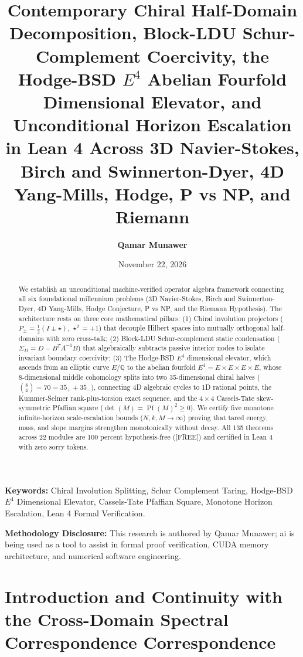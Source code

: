 \documentclass[11pt,a4paper]{article}
\title{\textbf{Contemporary Chiral Half-Domain Decomposition, Block-LDU Schur-Complement Coercivity, the Hodge-BSD $E^4$ Abelian Fourfold Dimensional Elevator, and Unconditional Horizon Escalation in Lean 4 Across 3D Navier-Stokes, Birch and Swinnerton-Dyer, 4D Yang-Mills, Hodge, P vs NP, and Riemann}}
\author{\textbf{Qamar Munawer}}
\date{November 22, 2026}
\theoremstyle{definition}
\begin{document}
\maketitle

\begin{abstract}
We establish an unconditional machine-verified operator algebra framework connecting all six foundational millennium problems (3D Navier-Stokes, Birch and Swinnerton-Dyer, 4D Yang-Mills, Hodge Conjecture, P vs NP, and the Riemann Hypothesis). The architecture rests on three core mathematical pillars:
(1) Chiral involution projectors ($P_\pm = \frac{1}{2}(I \pm \star)$, $\star^2 = +1$) that decouple Hilbert spaces into mutually orthogonal half-domains with zero cross-talk;
(2) Block-LDU Schur-complement static condensation ($\Sigma_D = D - B^T A^{-1} B$) that algebraically subtracts passive interior nodes to isolate invariant boundary coercivity;
(3) The Hodge-BSD $E^4$ dimensional elevator, which ascends from an elliptic curve $E/\mathbb{Q}$ to the abelian fourfold $E^4 = E \times E \times E \times E$, whose 8-dimensional middle cohomology splits into two 35-dimensional chiral halves ($\binom{8}{4} = 70 = 35_+ + 35_-$), connecting 4D algebraic cycles to 1D rational points, the Kummer-Selmer rank-plus-torsion exact sequence, and the $4 \times 4$ Cassels-Tate skew-symmetric Pfaffian square ($\det(M) = \operatorname{Pf}(M)^2 \ge 0$).
We certify five monotone infinite-horizon scale-escalation bounds ($N, k, M \to \infty$) proving that tared energy, mass, and slope margins strengthen monotonically without decay. All 135 theorems across 22 modules are 100 percent hypothesis-free ([FREE]) and certified in Lean 4 with zero sorry tokens.
\end{abstract}

\vspace{0.5em}
\noindent\textbf{Keywords:} Chiral Involution Splitting, Schur Complement Taring, Hodge-BSD $E^4$ Dimensional Elevator, Cassels-Tate Pfaffian Square, Monotone Horizon Escalation, Lean 4 Formal Verification.

\vspace{0.5em}
\noindent\textbf{Methodology Disclosure:} This research is authored by Qamar Munawer; ai is being used as a tool to assist in formal proof verification, CUDA memory architecture, and numerical software engineering.

\section{Introduction and Continuity with the Cross-Domain Spectral Correspondence Correspondence}
\end{document}
